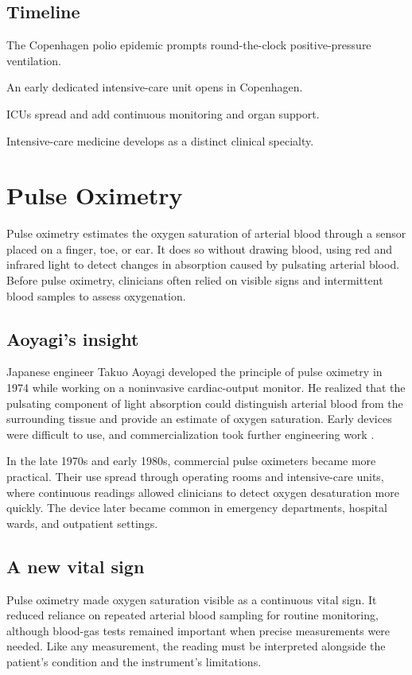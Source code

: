 \documentclass[12pt,oneside]{book}
\begin{document}
\section*{Timeline}
\begin{description}[leftmargin=2.3cm,style=nextline]
  \item[1952] The Copenhagen polio epidemic prompts round-the-clock positive-pressure ventilation.
  \item[1953] An early dedicated intensive-care unit opens in Copenhagen.
  \item[1960s] ICUs spread and add continuous monitoring and organ support.
  \item[Late twentieth century] Intensive-care medicine develops as a distinct clinical specialty.
\end{description}
\chapter[Pulse Oximetry]{Pulse Oximetry}

Pulse oximetry estimates the oxygen saturation of arterial blood through a
sensor placed on a finger, toe, or ear. It does so without drawing blood,
using red and infrared light to detect changes in absorption caused by
pulsating arterial blood. Before pulse oximetry, clinicians often relied on
visible signs and intermittent blood samples to assess oxygenation.

\section{Aoyagi's insight}
Japanese engineer Takuo Aoyagi developed the principle of pulse oximetry in 1974 while working on a noninvasive cardiac-output monitor. He realized that the pulsating component of light absorption could distinguish arterial blood from the surrounding tissue and provide an estimate of oxygen saturation. Early devices were difficult to use, and commercialization took further engineering work \cite{pulseOximetryHistory,pulseOximetryTribute}.

In the late 1970s and early 1980s, commercial pulse oximeters became more
practical. Their use spread through operating rooms and intensive-care units,
where continuous readings allowed clinicians to detect oxygen desaturation
more quickly. The device later became common in emergency departments,
hospital wards, and outpatient settings.

\section{A new vital sign}
Pulse oximetry made oxygen saturation visible as a continuous vital sign. It reduced reliance on repeated arterial blood sampling for routine monitoring, although blood-gas tests remained important when precise measurements were needed. Like any measurement, the reading must be interpreted alongside the patient's condition and the instrument's limitations.
\end{document}
